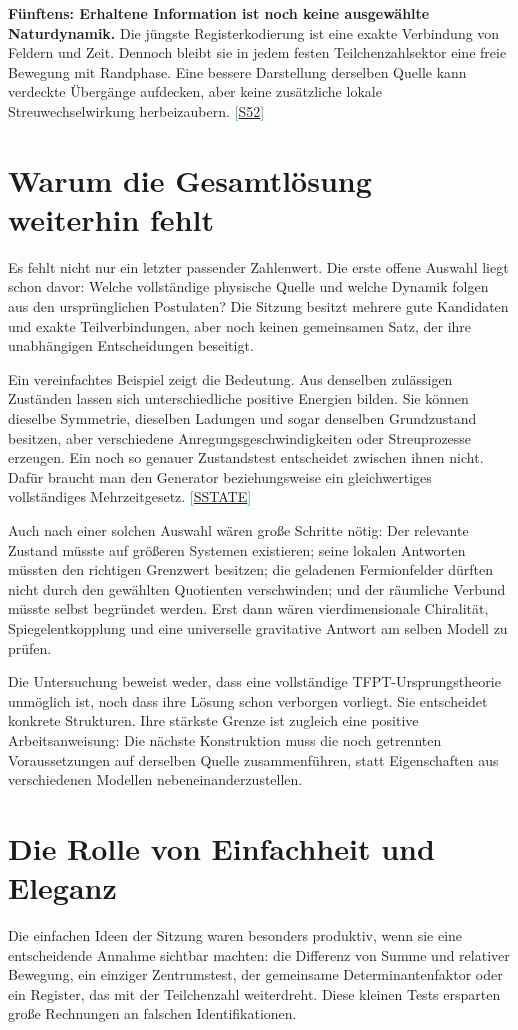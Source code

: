\documentclass[11pt,a4paper,oneside,parskip=half,headings=normal,numbers=noenddot,bibliography=totoc]{scrreprt}
\newcommand{\src}[1]{\textcolor{teal}{\small[\hyperref[s:#1]{S#1}]}}
\begin{document}
\textbf{Fünftens: Erhaltene Information ist noch keine ausgewählte Naturdynamik.} Die jüngste Registerkodierung ist eine exakte Verbindung von Feldern und Zeit. Dennoch bleibt sie in jedem festen Teilchenzahlsektor eine freie Bewegung mit Randphase. Eine bessere Darstellung derselben Quelle kann verdeckte Übergänge aufdecken, aber keine zusätzliche lokale Streuwechselwirkung herbeizaubern. \src{52}

\section{Warum die Gesamtlösung weiterhin fehlt}
Es fehlt nicht nur ein letzter passender Zahlenwert. Die erste offene Auswahl liegt schon davor: Welche vollständige physische Quelle und welche Dynamik folgen aus den ursprünglichen Postulaten? Die Sitzung besitzt mehrere gute Kandidaten und exakte Teilverbindungen, aber noch keinen gemeinsamen Satz, der ihre unabhängigen Entscheidungen beseitigt.

Ein vereinfachtes Beispiel zeigt die Bedeutung. Aus denselben zulässigen Zuständen lassen sich unterschiedliche positive Energien bilden. Sie können dieselbe Symmetrie, dieselben Ladungen und sogar denselben Grundzustand besitzen, aber verschiedene Anregungsgeschwindigkeiten oder Streuprozesse erzeugen. Ein noch so genauer Zustandstest entscheidet zwischen ihnen nicht. Dafür braucht man den Generator beziehungsweise ein gleichwertiges vollständiges Mehrzeitgesetz. \src{STATE}

Auch nach einer solchen Auswahl wären große Schritte nötig: Der relevante Zustand müsste auf größeren Systemen existieren; seine lokalen Antworten müssten den richtigen Grenzwert besitzen; die geladenen Fermionfelder dürften nicht durch den gewählten Quotienten verschwinden; und der räumliche Verbund müsste selbst begründet werden. Erst dann wären vierdimensionale Chiralität, Spiegelentkopplung und eine universelle gravitative Antwort am selben Modell zu prüfen.

Die Untersuchung beweist weder, dass eine vollständige TFPT-Ursprungstheorie unmöglich ist, noch dass ihre Lösung schon verborgen vorliegt. Sie entscheidet konkrete Strukturen. Ihre stärkste Grenze ist zugleich eine positive Arbeitsanweisung: Die nächste Konstruktion muss die noch getrennten Voraussetzungen auf derselben Quelle zusammenführen, statt Eigenschaften aus verschiedenen Modellen nebeneinanderzustellen.

\section{Die Rolle von Einfachheit und Eleganz}
Die einfachen Ideen der Sitzung waren besonders produktiv, wenn sie eine entscheidende Annahme sichtbar machten: die Differenz von Summe und relativer Bewegung, ein einziger Zentrumstest, der gemeinsame Determinantenfaktor oder ein Register, das mit der Teilchenzahl weiterdreht. Diese kleinen Tests ersparten große Rechnungen an falschen Identifikationen.
\end{document}
